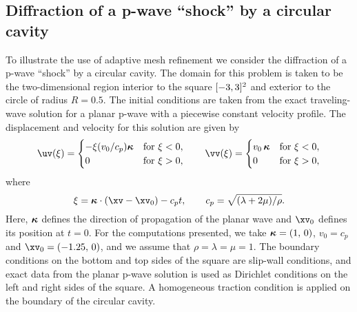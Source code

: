 \newcommand{\Gd}{\Gc_{CS}} 
\subsection{Diffraction of a p-wave ``shock'' by a circular cavity}\label{sec:cylDiffract}


To illustrate the use of adaptive mesh refinement we consider the diffraction
of a p-wave ``shock'' by a circular cavity.  The domain for this problem is taken to be the
two-dimensional region interior to the square $[-3,3]\sp2$ and exterior to the circle of
radius $R=0.5$.  The initial conditions are taken from 
the exact traveling-wave solution for a planar p-wave with a piecewise constant velocity profile.
The displacement and velocity for this solution are given by
\[
 \uv (\xi)  = \begin{cases}  -\xi(v_0/c_p)\kappav  & \mbox{for $\xi<0$}, \\
                                0  & \mbox{for $\xi>0$,}  \end{cases} \qquad
 \vv (\xi)  = \begin{cases}  v_0\,\kappav  & \mbox{for $\xi<0$}, \\
                                0  & \mbox{for $\xi>0$},\end{cases}
\]
where
\[
\xi = \kappav\cdot(\xv-\xv_0) - c_p t ,\qquad c_p = \sqrt{{(\lambda+2\mu)}/{\rho}}.
\]
Here, $\boldsymbol{\kappa}$ defines the direction of propagation of the planar wave and
$\xv_0$ defines its position at $t=0$. For the computations presented, we take
$\boldsymbol{\kappa}=(1,\,0)$, $v_0=c_p$ and $\xv_0=(-1.25,\,0)$, and we assume that
$\rho=\lambda=\mu=1$.  The boundary conditions on the
bottom and top sides of the square are slip-wall conditions, and exact data from the planar p-wave
solution is used as Dirichlet conditions on the left and right sides of the square.  A homogeneous
traction condition is applied on the boundary of the circular cavity.

